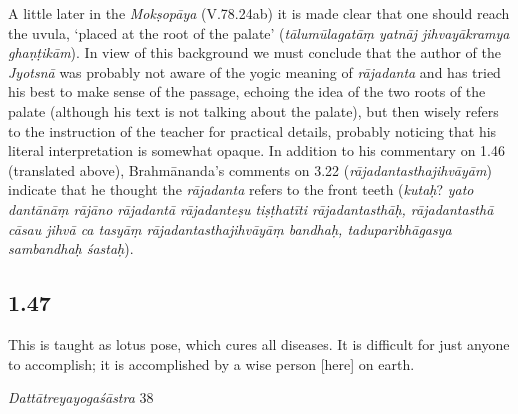 \begin{ekdosis}
\begin{philcomm}[hp01_045]
A little later in the \emph{Mokṣopāya} (V.78.24ab) it is made clear that one should reach the uvula, `placed at the root of the palate' (\emph{tālumūlagatāṃ yatnāj jihvayākramya ghaṇṭikām}). In view of this background we must conclude that the author of the \emph{Jyotsnā} was probably not aware of the yogic meaning of \emph{rājadanta} and has tried his best to make sense of the passage,
echoing the idea of the two roots of the palate (although his text is not talking about the palate), but then wisely refers to the instruction of the teacher for practical details, probably noticing that his literal interpretation is somewhat opaque. In addition to his commentary on 1.46 (translated above), Brahmānanda’s comments on 3.22 (\emph{rājadantasthajihvāyām}) indicate that he thought the \emph{rājadanta} refers to the front teeth (\emph{kutaḥ}? \emph{yato dantānāṃ rājāno rājadantā rājadanteṣu tiṣṭhatīti rājadantasthāḥ, rājadantasthā cāsau jihvā ca tasyāṃ rājadantasthajihvāyāṃ bandhaḥ, taduparibhāgasya sambandhaḥ śastaḥ}).
\end{philcomm}





\subsection*{1.47}
\begin{translation}[hp01_047]
This is taught as lotus pose, which cures all diseases. It is difficult for just anyone to accomplish; it is accomplished by a wise person [here] on earth.
\end{translation}

\begin{sources}[hp01_047]
\emph{Dattātreyayogaśāstra} 38


\end{sources}
\end{ekdosis}
